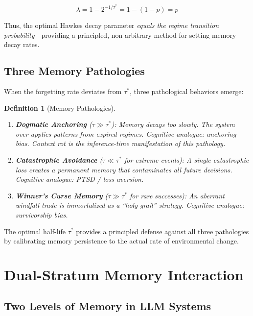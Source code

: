 \documentclass[11pt, a4paper]{article}
\newtheorem{definition}{Definition}
\begin{document}
\begin{equation}
  \lambda = 1 - 2^{-1/\tau^*} = 1 - (1-p) = p
\end{equation}

Thus, the optimal Hawkes decay parameter \emph{equals the regime transition probability}---providing a principled, non-arbitrary method for setting memory decay rates.

\subsection{Three Memory Pathologies}

When the forgetting rate deviates from $\tau^*$, three pathological behaviors emerge:

\begin{definition}[Memory Pathologies]
\label{def:pathologies}
\begin{enumerate}
  \item \textbf{Dogmatic Anchoring} ($\tau \gg \tau^*$): Memory decays too slowly. The system over-applies patterns from expired regimes. Cognitive analogue: anchoring bias. \emph{Context rot is the inference-time manifestation of this pathology.}
  
  \item \textbf{Catastrophic Avoidance} ($\tau \ll \tau^*$ for extreme events): A single catastrophic loss creates a permanent memory that contaminates all future decisions. Cognitive analogue: PTSD / loss aversion.
  
  \item \textbf{Winner's Curse Memory} ($\tau \gg \tau^*$ for rare successes): An aberrant windfall trade is immortalized as a ``holy grail'' strategy. Cognitive analogue: survivorship bias.
\end{enumerate}
\end{definition}

The optimal half-life $\tau^*$ provides a principled defense against all three pathologies by calibrating memory persistence to the actual rate of environmental change.


\section{Dual-Stratum Memory Interaction}
\label{sec:dual}

\subsection{Two Levels of Memory in LLM Systems}
\end{document}
